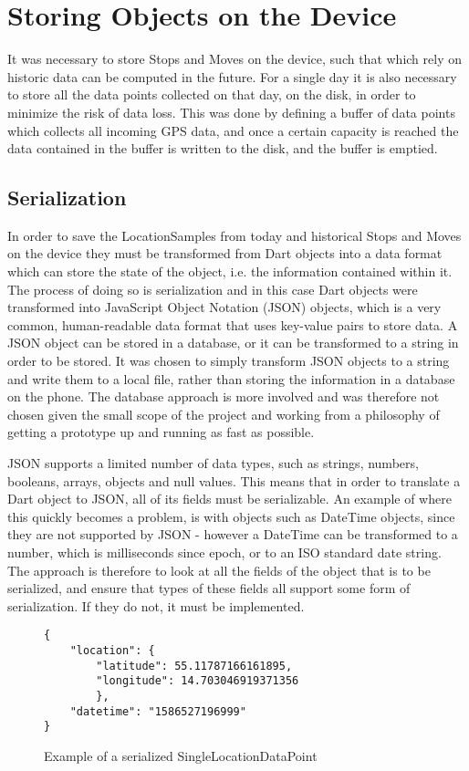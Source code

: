\section{Storing Objects on the Device}
It was necessary to store Stops and Moves on the device, such that which rely on historic data can be computed in the future. For a single day it is also necessary to store all the data points collected on that day, on the disk, in order to minimize the risk of data loss. This was done by defining a buffer of data points which collects all incoming GPS data, and once a certain capacity is reached the data contained in the buffer is written to the disk, and the buffer is emptied.

\subsection{Serialization}
In order to save the LocationSamples from today and historical Stops and Moves on the device they must be transformed from Dart objects into a data format which can store the state of the object, i.e. the information contained within it. The process of doing so is serialization and in this case Dart objects were transformed into JavaScript Object Notation (JSON) objects, which is a very common, human-readable data format that uses key-value pairs to store data. A JSON object can be stored in a database, or it can be transformed to a string in order to be stored. It was chosen to simply transform JSON objects to a string and write them to a local file, rather than storing the information in a database on the phone. The database approach is more involved and was therefore not chosen given the small scope of the project and working from a philosophy of getting a prototype up and running as fast as possible.

JSON supports a limited number of data types, such as strings, numbers, booleans, arrays, objects and null values. This means that in order to translate a Dart object to JSON, all of its fields must be serializable. An example of where this quickly becomes a problem, is with objects such as DateTime objects, since they are not supported by JSON - however a DateTime can be transformed to a number, which is milliseconds since epoch, or to an ISO standard date string. The approach is therefore to look at all the fields of the object that is to be serialized, and ensure that types of these fields all support some form of serialization. If they do not, it must be implemented.

\begin{figure}
    \centering
\begin{verbatim}
{
    "location": {
        "latitude": 55.11787166161895,
        "longitude": 14.703046919371356
        },
    "datetime": "1586527196999"
}
\end{verbatim}
    \caption{Example of a serialized SingleLocationDataPoint}
    \label{fig:serialized_point}
\end{figure}

